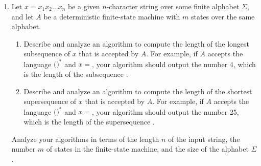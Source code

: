 \begin{exercises}
\begin{enumerate}[label=\arabic*.,ref=\thechapter.\arabic*,leftmargin=*,align=left,itemsep=1.5ex plus 0.5ex,start=12]
\item {} Let $x = x_1 x_2 \dots x_n$ be a given $n$-character string over some finite alphabet $\Sigma$, and let $A$ be a deterministic finite-state machine with $m$ states over the same alphabet.
\begin{enumerate}
\item Describe and analyze an algorithm to compute the length of the longest subsequence of $x$ that is accepted by $A$.
For example, if $A$ accepts the language $($$)^*$ and $x = {}$, your algorithm should output the number 4, which is the length of the subsequence .
\item Describe and analyze an algorithm to compute the length of the shortest supersequence of $x$ that is accepted by $A$.
For example, if $A$ accepts the language $($$)^*$ and $x = {}$, your algorithm should output the number 25, which is the length of the supersequence .
\end{enumerate}
Analyze your algorithms in terms of the length $n$ of the input string, the number $m$ of states in the finite-state machine, and the size of the alphabet $\Sigma$.


\end{enumerate}
\end{exercises}
